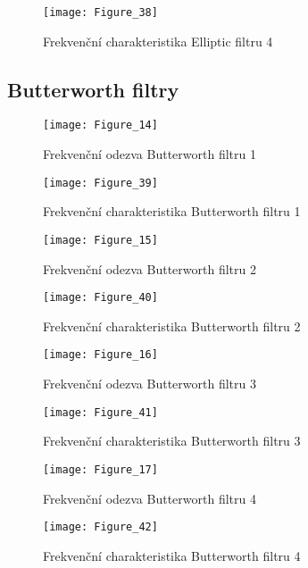 \begin{figure}[H] 
	\centering
	\texttt{[image: Figure\_38]}
	\caption{Frekvenční charakteristika Elliptic filtru 4}
\end{figure}

\subsection{Butterworth filtry}
\begin{figure}[H] 
	\centering
	\texttt{[image: Figure\_14]}
	\caption{Frekvenční odezva Butterworth filtru 1}
\end{figure}

\begin{figure}[H] 
	\centering
	\texttt{[image: Figure\_39]}
	\caption{Frekvenční charakteristika Butterworth filtru 1}
\end{figure}

\begin{figure}[H] 
	\centering
	\texttt{[image: Figure\_15]}
	\caption{Frekvenční odezva Butterworth filtru 2}
\end{figure}

\begin{figure}[H] 
	\centering
	\texttt{[image: Figure\_40]}
	\caption{Frekvenční charakteristika Butterworth filtru 2}
\end{figure}

\begin{figure}[H] 
	\centering
	\texttt{[image: Figure\_16]}
	\caption{Frekvenční odezva Butterworth filtru 3}
\end{figure}

\begin{figure}[H] 
	\centering
	\texttt{[image: Figure\_41]}
	\caption{Frekvenční charakteristika Butterworth filtru 3}
\end{figure}

\begin{figure}[H] 
	\centering
	\texttt{[image: Figure\_17]}
	\caption{Frekvenční odezva Butterworth filtru 4}
\end{figure}

\begin{figure}[H] 
	\centering
	\texttt{[image: Figure\_42]}
	\caption{Frekvenční charakteristika Butterworth filtru 4}
\end{figure}